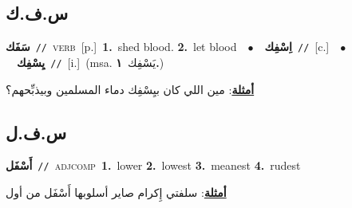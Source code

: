 \documentclass[10pt,a4paper,twoside]{article} %
\begin{document}
\begin{multicols}{2}
\vspace{-3mm}
\subsection*{\color{blue}\foreignlanguage{arabic}{س.ف.ك}\color{blue}{}} 

{\setlength\topsep{0pt}\textbf{\foreignlanguage{arabic}{سَفَك}}\ {\color{gray}\texttt{//}\color{black}}\ \textsc{verb}\ [p.]\ \textbf{1.}~shed blood.  \textbf{2.}~let blood\ \ $\bullet$\ \ \setlength\topsep{0pt}\textbf{\foreignlanguage{arabic}{اِسْفِك}}\ {\color{gray}\texttt{//}\color{black}}\ [c.]\ \ $\bullet$\ \ \setlength\topsep{0pt}\textbf{\foreignlanguage{arabic}{يِسْفِك}}\ {\color{gray}\texttt{//}\color{black}}\ [i.]\ \color{gray}(msa. \foreignlanguage{arabic}{يَسْفِك}~\foreignlanguage{arabic}{\textbf{١.}})\color{black}\  \begin{flushright}\color{gray}\foreignlanguage{arabic}{\textbf{\underline{\foreignlanguage{arabic}{أمثلة}}}: مين اللي كان بيِسْفِك دماء المسلمين وبيذبِّحهم؟}\end{flushright}\color{black}} \vspace{2mm}

\vspace{-3mm}
\subsection*{\color{blue}\foreignlanguage{arabic}{س.ف.ل}\color{blue}{}} 

{\setlength\topsep{0pt}\textbf{\foreignlanguage{arabic}{أَسْفَل}}\ {\color{gray}\texttt{//}\color{black}}\ \textsc{adj\textunderscore comp}\ \textbf{1.}~lower  \textbf{2.}~lowest  \textbf{3.}~meanest  \textbf{4.}~rudest\  \begin{flushright}\color{gray}\foreignlanguage{arabic}{\textbf{\underline{\foreignlanguage{arabic}{أمثلة}}}: سلفتي إِكرام صاير أسلوبها أَسْفَل من أول}\end{flushright}\color{black}} \vspace{2mm}


\end{multicols}
\end{document}
